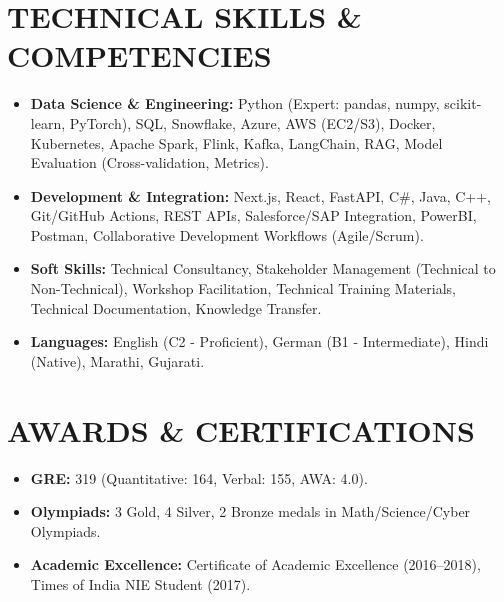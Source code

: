 \documentclass[10pt, a4paper]{article}
\begin{document}
\section{TECHNICAL SKILLS \& COMPETENCIES}
\begin{itemize}
    \item \textbf{Data Science \& Engineering:} Python (Expert: pandas, numpy, scikit-learn, PyTorch), SQL, Snowflake, Azure, AWS (EC2/S3), Docker, Kubernetes, Apache Spark, Flink, Kafka, LangChain, RAG, Model Evaluation (Cross-validation, Metrics).
    \item \textbf{Development \& Integration:} Next.js, React, FastAPI, C\#, Java, C++, Git/GitHub Actions, REST APIs, Salesforce/SAP Integration, PowerBI, Postman, Collaborative Development Workflows (Agile/Scrum).
    \item \textbf{Soft Skills:} Technical Consultancy, Stakeholder Management (Technical to Non-Technical), Workshop Facilitation, Technical Training Materials, Technical Documentation, Knowledge Transfer.
    \item \textbf{Languages:} English (C2 - Proficient), German (B1 - Intermediate), Hindi (Native), Marathi, Gujarati.
\end{itemize}

\section{AWARDS \& CERTIFICATIONS}
\begin{itemize}
    \item \textbf{GRE:} 319 (Quantitative: 164, Verbal: 155, AWA: 4.0).
    \item \textbf{Olympiads:} 3 Gold, 4 Silver, 2 Bronze medals in Math/Science/Cyber Olympiads.
    \item \textbf{Academic Excellence:} Certificate of Academic Excellence (2016--2018), Times of India NIE Student (2017).
\end{itemize}
\end{document}
